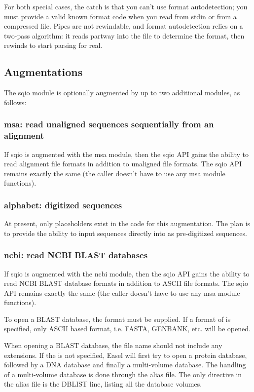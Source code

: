 For both special cases, the catch is that you can't use format
autodetection; you must provide a valid known format code when you
read from stdin or from a compressed file. Pipes are not rewindable,
and format autodetection relies on a two-pass algorithm: it reads
partway into the file to determine the format, then rewinds to start
parsing for real.

\subsection{Augmentations}

The sqio module is optionally augmented by up to two additional
modules, as follows:

\subsubsection{msa: read unaligned sequences sequentially from an alignment}

If sqio is augmented with the msa module, then the sqio API gains the
ability to read alignment file formats in addition to unaligned file
formats. The sqio API remains exactly the same (the caller doesn't
have to use any msa module functions).

\subsubsection{alphabet: digitized sequences}

At present, only placeholders exist in the code for this augmentation.
The plan is to provide the ability to input sequences directly into
 as pre-digitized sequences.


\subsubsection{ncbi: read NCBI BLAST databases}

If sqio is augmented with the ncbi module, then the sqio API gains the
ability to read NCBI BLAST database formats in addition to ASCII file
formats. The sqio API remains exactly the same (the caller doesn't
have to use any msa module functions).

To open a BLAST database, the format must be supplied.  If a format
of  is specified, only ASCII based format,
i.e. FASTA, GENBANK, etc. will be opened.

When opening a BLAST database, the file name should not include any
extensions.  If the  is not specified, Easel
will first try to open a protein database, followed by a DNA database
and finally a multi-volume database.  The handling of a multi-volume
database is done through the alias file.  The only directive in
the alias file is the DBLIST line, listing all the database volumes.




